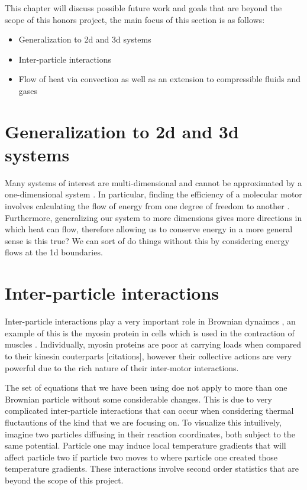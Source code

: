 This chapter will discuss possible future work and goals that are beyond the scope of this honors project, the main focus of this section is as follows:

\begin{itemize}
    \item{Generalization to 2d and 3d systems}
    \item{Inter-particle interactions}
    \item{Flow of heat via convection as well as an extension to compressible fluids and gases}
\end{itemize}

\section{Generalization to 2d and 3d systems}
Many systems of interest are multi-dimensional and cannot be approximated by a one-dimensional system \cite{KellerBustamante2000,Magnasco1994,Reimann2001,ChallisJack2014,M.W.Jack2016}. In particular, finding the efficiency of a molecular motor involves calculating the flow of energy from one degree of freedom to another \cite{M.W.Jack2016}. Furthermore, generalizing our system to more dimensions gives more directions in which heat can flow, therefore allowing us to conserve energy in a more general sense {\color{red} is this true? We can sort of do things without this by considering energy flows at the 1d boundaries.}

\section{Inter-particle interactions}
Inter-particle interactions play a very important role in Brownian dynaimcs \cite{leibler1990physical,Leibler1993}, an example of this is the myosin protein in cells which is used in the contraction of muscles \cite{TyskaWarshaw2002}. Individually, myosin proteins are poor at carrying loads when compared to their kinesin couterparts {\color{red} [citations]}, however their collective actions are very powerful due to the rich nature of their inter-motor interactions.

The set of equations that we have been using doe not apply to more than one Brownian particle without some considerable changes. This is due to very complicated inter-particle interactions that can occur when considering thermal fluctautions of the kind that we are focusing on. To visualize this intuilively, imagine two particles diffusing in their reaction coordinates, both subject to the same potential. Particle one may induce local temperature gradients that will affect particle two if particle two moves to where particle one created those temperature gradients. These interactions involve second order statistics that are beyond the scope of this project.

